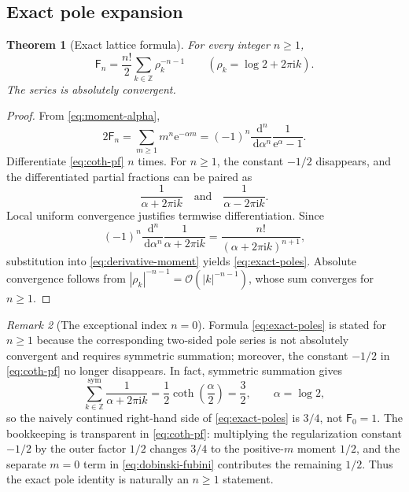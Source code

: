 \documentclass[11pt,a4paper]{article}
\newtheorem{theorem}{Theorem}[section]
\theoremstyle{definition}
\theoremstyle{remark}
\newtheorem{remark}[theorem]{Remark}
\newcommand{\Fub}{\mathsf F}
\newcommand{\e}{\mathrm e}
\newcommand{\ii}{\mathrm i}
\newcommand{\dd}{\,\mathrm d}
\newcommand{\cO}{\mathcal O}
\newcommand{\abs}[1]{\left|#1\right|}
\newcommand{\Z}{\mathbb Z}
\begin{document}
\subsection{Exact pole expansion}

\begin{theorem}[Exact lattice formula]\label{thm:exact-poles}
For every integer \(n\ge1\),
\begin{equation}\label{eq:exact-poles}
 \boxed{\displaystyle
 \Fub_n=\frac{n!}{2}\sum_{k\in\Z}\rho_k^{-n-1}}
 \qquad
 \left(\rho_k=\log2+2\pi\ii k\right).
\end{equation}
The series is absolutely convergent.
\end{theorem}

\begin{proof}
From \eqref{eq:moment-alpha},
\begin{equation}\label{eq:derivative-moment}
 2\Fub_n
 =\sum_{m\ge1}m^n\e^{-\alpha m}
 =(-1)^n\frac{\dd^n}{\dd\alpha^n}
   \frac1{\e^\alpha-1}.
\end{equation}
Differentiate \eqref{eq:coth-pf} \(n\) times.  For \(n\ge1\), the constant
\(-1/2\) disappears, and the differentiated partial fractions can be paired as
\[
 \frac1{\alpha+2\pi\ii k}
 \quad\text{and}\quad
 \frac1{\alpha-2\pi\ii k}.
\]
Local uniform convergence justifies termwise differentiation.  Since
\[
 (-1)^n\frac{\dd^n}{\dd\alpha^n}
 \frac1{\alpha+2\pi\ii k}
 =\frac{n!}{(\alpha+2\pi\ii k)^{n+1}},
\]
substitution into \eqref{eq:derivative-moment} yields
\eqref{eq:exact-poles}.  Absolute convergence follows from
\(
 \abs{\rho_k}^{-n-1}=\cO(\abs{k}^{-n-1})
\), whose sum converges for \(n\ge1\).
\end{proof}

\begin{remark}[The exceptional index \(n=0\)]
Formula \eqref{eq:exact-poles} is stated for \(n\ge1\) because the corresponding
two-sided pole series is not absolutely convergent and requires symmetric
summation; moreover, the constant \(-1/2\) in
\eqref{eq:coth-pf} no longer disappears.  In fact, symmetric summation gives
\[
 \sum_{k\in\Z}^{\mathrm{sym}}\frac1{\alpha+2\pi\ii k}
 =\frac12\coth\!\left(\frac\alpha2\right)=\frac32,
 \qquad \alpha=\log 2,
\]
so the naively continued right-hand side of \eqref{eq:exact-poles} is
\(3/4\), not \(\Fub_0=1\).  The bookkeeping is transparent in
\eqref{eq:coth-pf}: multiplying the regularization constant \(-1/2\) by the
outer factor \(1/2\) changes \(3/4\) to the positive-\(m\) moment \(1/2\),
and the separate \(m=0\) term in \eqref{eq:dobinski-fubini} contributes the
remaining \(1/2\).  Thus the exact pole identity is naturally an
\(n\ge1\) statement.
\end{remark}
\end{document}
